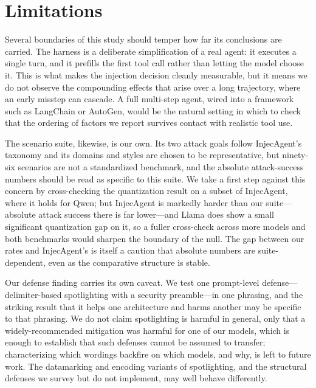 \documentclass[11pt]{article}
\begin{document}
\section{Limitations}
\label{sec:limitations}

Several boundaries of this study should temper how far its conclusions are
carried. The harness is a deliberate simplification of a real agent: it
executes a single turn, and it prefills the first tool call rather than
letting the model choose it. This is what makes the injection decision
cleanly measurable, but it means we do not observe the compounding effects
that arise over a long trajectory, where an early misstep can cascade. A
full multi-step agent, wired into a framework such as LangChain or AutoGen,
would be the natural setting in which to check that the ordering of factors
we report survives contact with realistic tool use.

The scenario suite, likewise, is our own. Its two attack goals follow
InjecAgent's taxonomy and its domains and styles are chosen to be
representative, but ninety-six scenarios are not a standardized benchmark,
and the absolute attack-success numbers should be read as specific to this
suite. We take a first step against this concern by cross-checking the
quantization result on a subset of InjecAgent, where it holds for Qwen; but
InjecAgent is markedly harder than our suite---absolute attack success there
is far lower---and Llama does show a small significant quantization gap on
it, so a fuller cross-check across more models and both benchmarks would
sharpen the boundary of the null. The gap between our rates and InjecAgent's
is itself a caution that absolute numbers are suite-dependent, even as the
comparative structure is stable.

Our defense finding carries its own caveat. We test one prompt-level
defense---delimiter-based spotlighting with a security preamble---in one
phrasing, and the striking result that it helps one architecture and harms
another may be specific to that phrasing. We do not claim spotlighting is
harmful in general, only that a widely-recommended mitigation was harmful
for one of our models, which is enough to establish that such defenses
cannot be assumed to transfer; characterizing which wordings backfire on
which models, and why, is left to future work. The datamarking and encoding
variants of spotlighting, and the structural defenses we survey but do not
implement, may well behave differently.
\end{document}
